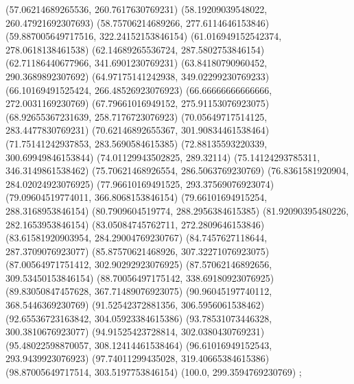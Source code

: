 {{{		(57.06214689265536, 260.7617630769231)
		(58.19209039548022, 260.47921692307693)
		(58.75706214689266, 277.6114646153846)
		(59.887005649717516, 322.24152153846154)
		(61.016949152542374, 278.0618138461538)
		(62.14689265536724, 287.5802753846154)
		(62.71186440677966, 341.6901230769231)
		(63.84180790960452, 290.3689892307692)
		(64.97175141242938, 349.02299230769233)
		(66.10169491525424, 266.48526923076923)
		(66.66666666666666, 272.0031169230769)
		(67.79661016949152, 275.91153076923075)
		(68.92655367231639, 258.7176723076923)
		(70.05649717514125, 283.4477830769231)
		(70.62146892655367, 301.90834461538464)
		(71.75141242937853, 283.5690584615385)
		(72.88135593220339, 300.69949846153844)
		(74.01129943502825, 289.32114)
		(75.14124293785311, 346.3149861538462)
		(75.70621468926554, 286.5063769230769)
		(76.8361581920904, 284.02024923076925)
		(77.96610169491525, 293.37569076923074)
		(79.09604519774011, 366.8068153846154)
		(79.66101694915254, 288.3168953846154)
		(80.7909604519774, 288.2956384615385)
		(81.92090395480226, 282.1653953846154)
		(83.05084745762711, 272.2809646153846)
		(83.61581920903954, 284.29004769230767)
		(84.7457627118644, 287.3709076923077)
		(85.87570621468926, 307.32271076923075)
		(87.00564971751412, 302.90292923076925)
		(87.57062146892656, 309.53450153846154)
		(88.70056497175142, 338.69180923076925)
		(89.83050847457628, 367.71489076923075)
		(90.96045197740112, 368.5446369230769)
		(91.52542372881356, 306.5956061538462)
		(92.65536723163842, 304.05923384615386)
		(93.78531073446328, 300.3810676923077)
		(94.91525423728814, 302.0380430769231)
		(95.48022598870057, 308.12414461538464)
		(96.61016949152543, 293.9439923076923)
		(97.74011299435028, 319.40665384615386)
		(98.87005649717514, 303.5197753846154)
		(100.0, 299.3594769230769)
	};

}}
